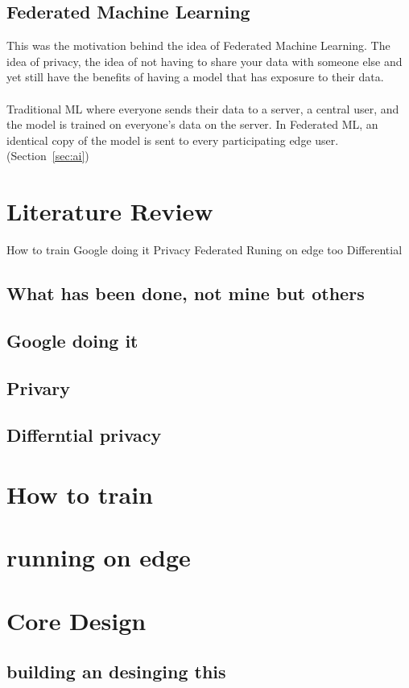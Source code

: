 \documentclass[10pt]{article}
\begin{document}
\subsection{Federated Machine Learning}
This was the motivation behind the idea of Federated Machine Learning. The idea of privacy, the idea of not having to share your data with someone else and yet still have the benefits of having a model that has exposure to their data.
\\\\
Traditional ML where everyone sends their data to a server, a central user, and the model is trained on everyone's data on the server. In Federated ML, an identical copy of the model is sent to every participating edge user. 
(Section~\ref{sec:ai}) 
\clearpage
\section{Literature Review}
How to train 
Google doing it
Privacy
Federated
Runing on edge too
Differential 

\subsection{What has been done, not mine but others}
\subsection{Google doing it}
\subsection{Privary}
\subsection{Differntial privacy}

\clearpage
\section{How to train}

\clearpage
\section{running on edge}

\clearpage
\section{Core Design}
\subsection{building an desinging this}
\end{document}
